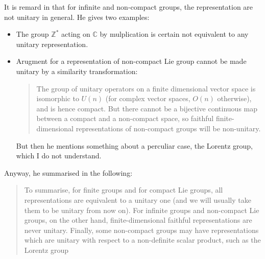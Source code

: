 \begin{remark}
    It is remard in \cite{Ludeling} that for infinite and non-compact
    groups, the representation are not unitary in general. He gives
    two examples:
    \begin{itemize}
        \item The group $\mathbb{Z}^*$ acting on $\mathbb{C}$ by
            mulplication is certain not equivalent to any unitary
            representation.
        \item Arugment for a representation of non-compact Lie group
            cannot be made unitary by a similarity transformation:
            \begin{quote}
                The group of unitary operators on a finite dimensional
                vector space is isomorphic to $U(n)$ (for complex
                vector spaces, $O(n)$ otherwise), and is hence
                compact. But there cannot be a bijective continuous
                map between a compact and a non-compact space, so
                faithful finite-dimensional representations of
                non-compact groups will be non-unitary. 
            \end{quote}
            But then he mentions something about a perculiar case, the
            Lorentz group, which I do not understand. 
    \end{itemize}
\end{remark}
Anyway, he summarised in the following:
\begin{quote}
   To summarise, for finite groups and for compact Lie groups, all
   representations are equivalent to a unitary one (and we will
   usually take them to be unitary from now on).  For infinite groups
   and non-compact Lie groups, on the other hand, finite-dimensional
   faithful representations are never unitary. Finally, some
   non-compact groups may have representations which are unitary with
   respect to a non-definite scalar product, such as the Lorentz group 
\end{quote}

